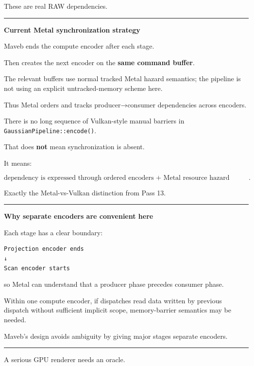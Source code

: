 These are real RAW dependencies.

\begin{center}\rule{0.5\linewidth}{0.5pt}\end{center}

\textbf{Current Metal synchronization strategy}

Maveb ends the compute encoder after each stage.

Then creates the next encoder on the \textbf{same command buffer}.

The relevant buffers use normal tracked Metal hazard semantics; the pipeline is not using an explicit untracked-memory scheme here.

Thus Metal orders and tracks producer→consumer dependencies across encoders.

There is no long sequence of Vulkan-style manual barriers in \texttt{GaussianPipeline::encode()}.

That does \textbf{not} mean synchronization is absent.

It means:

\[
\boxed{
\text{dependency is expressed through ordered encoders + Metal resource hazard tracking}.
}
\]

Exactly the Metal-vs-Vulkan distinction from Pass 13.

\begin{center}\rule{0.5\linewidth}{0.5pt}\end{center}

\textbf{Why separate encoders are convenient here}

Each stage has a clear boundary:

\protect{}\label{9acmg5}%
\begin{verbatim}
Projection encoder ends
↓
Scan encoder starts
\end{verbatim}

so Metal can understand that a producer phase precedes consumer phase.

Within one compute encoder, if dispatches read data written by previous dispatch without sufficient implicit scope, memory-barrier semantics may be needed.

Maveb's design avoids ambiguity by giving major stages separate encoders.

\begin{center}\rule{0.5\linewidth}{0.5pt}\end{center}

A serious GPU renderer needs an oracle.

